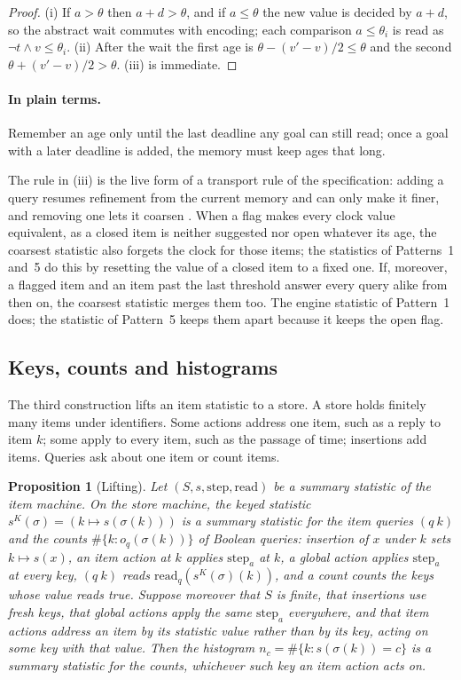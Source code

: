 \documentclass[11pt]{article}
\newcommand{\step}{\mathrm{step}}
\newcommand{\rd}{\mathrm{read}}
\newcommand{\plain}{\paragraph{In plain terms.}}
\theoremstyle{definition}
\theoremstyle{plain}
\newtheorem{proposition}[definition]{Proposition}
\begin{document}
\begin{proof}
(i) If $a>\theta$ then $a+d>\theta$, and if $a\le\theta$ the new value is decided by $a+d$, so the
abstract wait commutes with encoding; each comparison $a\le\theta_i$ is read as
$\lnot t\land v\le\theta_i$. (ii) After the wait the first age is $\theta-(v'-v)/2\le\theta$ and the
second $\theta+(v'-v)/2>\theta$. (iii) is immediate.
\end{proof}

\plain Remember an age only until the last deadline any goal can still read; once a goal with a
later deadline is added, the memory must keep ages that long.

The rule in (iii) is the live form of a transport rule of the specification: adding a query resumes
refinement from the current memory and can only make it finer, and removing one lets it coarsen
\cite[Section~4.8]{spec}. When a flag makes every clock value equivalent, as a closed item is
neither suggested nor open whatever its age, the coarsest statistic also forgets the clock for those
items; the statistics of Patterns~1 and~5 do this by resetting the value of a closed item to a
fixed one. If, moreover, a flagged item and an item past the last threshold answer every query
alike from then on, the coarsest statistic merges them too. The engine statistic of Pattern~1 does;
the statistic of Pattern~5 keeps them apart because it keeps the open flag.

\subsection{Keys, counts and histograms}\label{sec:c3}

The third construction lifts an item statistic to a store. A store holds finitely many items under
identifiers. Some actions address one item, such as a reply to item $k$; some apply to every item,
such as the passage of time; insertions add items. Queries ask about one item or count items.

\begin{proposition}[Lifting]\label{prop:lift}
Let $(S,s,\step,\rd)$ be a summary statistic of the item machine. On the store machine, the keyed
statistic $s^K(\sigma)=(k\mapsto s(\sigma(k)))$ is a summary statistic for the item queries
$(q\ k)$ and the counts $\#\{k:o_q(\sigma(k))\}$ of Boolean queries: insertion of $x$ under $k$ sets
$k\mapsto s(x)$, an item action at $k$ applies $\step_a$ at $k$, a global action applies $\step_a$
at every key, $(q\ k)$ reads $\rd_q(s^K(\sigma)(k))$, and a count counts the keys whose value reads
true. Suppose moreover that $S$ is finite, that insertions use fresh keys, that global actions
apply the same $\step_a$ everywhere, and that item actions address an item by its statistic value
rather than by its key, acting on some key with that value. Then the histogram
$n_c=\#\{k:s(\sigma(k))=c\}$ is a summary statistic for the counts, whichever such key an item
action acts on.
\end{proposition}
\end{document}
